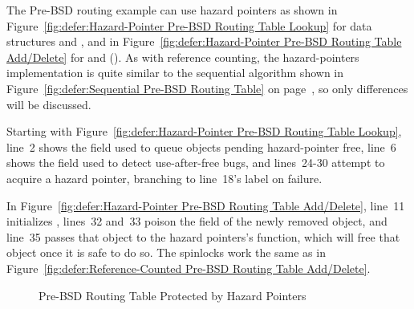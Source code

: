 The Pre-BSD routing example can use hazard pointers as shown in
Figure~\ref{fig:defer:Hazard-Pointer Pre-BSD Routing Table Lookup}
for data structures and , and in
Figure~\ref{fig:defer:Hazard-Pointer Pre-BSD Routing Table Add/Delete}
for  and 
().
As with reference counting, the hazard-pointers implementation
is quite similar to the sequential algorithm shown in
Figure~\ref{fig:defer:Sequential Pre-BSD Routing Table}
on
page~\pageref{fig:defer:Sequential Pre-BSD Routing Table},
so only differences will be discussed.

Starting with
Figure~\ref{fig:defer:Hazard-Pointer Pre-BSD Routing Table Lookup},
line~2 shows the  field used to queue objects pending
hazard-pointer free,
line~6 shows the  field used to detect use-after-free bugs,
and lines~24-30 attempt to acquire a hazard pointer, branching
to line~18's  label on failure.

In
Figure~\ref{fig:defer:Hazard-Pointer Pre-BSD Routing Table Add/Delete},
line~11 initializes ,
lines~32 and~33 poison the  field of the newly removed
object, and
line~35 passes that object to the hazard pointers's
 function, which will free that object once it
is safe to do so.
The spinlocks work the same as in
Figure~\ref{fig:defer:Reference-Counted Pre-BSD Routing Table Add/Delete}.

\begin{figure}[tb]
\centering
{}
\caption{Pre-BSD Routing Table Protected by Hazard Pointers}
\label{fig:defer:Pre-BSD Routing Table Protected by Hazard Pointers}
\end{figure}

